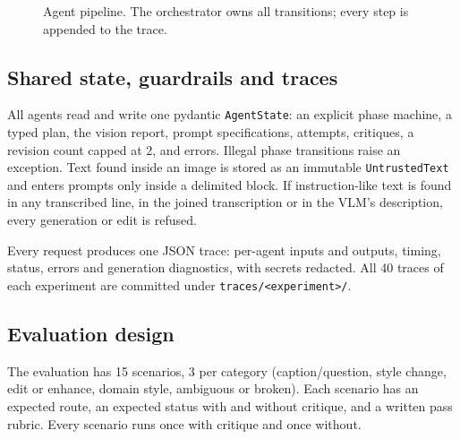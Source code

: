\documentclass[conference]{IEEEtran}
\begin{document}
\begin{figure}[t]\centering\footnotesize
{}
\caption{Agent pipeline. The orchestrator owns all transitions; every step is appended to the trace.}\label{fig:arch}\end{figure}

\subsection{Shared state, guardrails and traces}
All agents read and write one pydantic \texttt{AgentState}: an explicit phase machine, a typed plan, the vision report, prompt specifications, attempts, critiques, a revision count capped at 2, and errors. Illegal phase transitions raise an exception. Text found inside an image is stored as an immutable \texttt{UntrustedText} and enters prompts only inside a delimited block. If instruction-like text is found in any transcribed line, in the joined transcription or in the VLM's description, every generation or edit is refused.

Every request produces one JSON trace: per-agent inputs and outputs, timing, status, errors and generation diagnostics, with secrets redacted. All 40 traces of each experiment are committed under \texttt{traces/<experiment>/}.

\subsection{Evaluation design}
The evaluation has 15 scenarios, 3 per category (caption/question, style change, edit or enhance, domain style, ambiguous or broken). Each scenario has an expected route, an expected status with and without critique, and a written pass rubric. Every scenario runs once with critique and once without.
\end{document}
